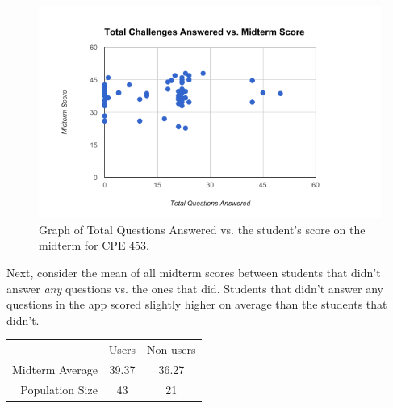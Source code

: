 \begin{figure}[ht]
	\includegraphics{figures/cramming-data}
	\caption{Graph of Total Questions Answered vs. the student's score on the midterm for CPE 453.}
	\label{fig:cramming}
\end{figure}
 
 \par Next, consider the mean of all midterm scores between students that didn't answer \textit{any} questions vs. the ones that did. Students that didn't answer any questions in the app scored slightly higher on average than the students that didn't.
  
 \begin{tabular}{ r c c }
  & Users & Non-users \\
 Midterm Average & 39.37 & 36.27 \\
 Population Size & 43 & 21
\end{tabular}

